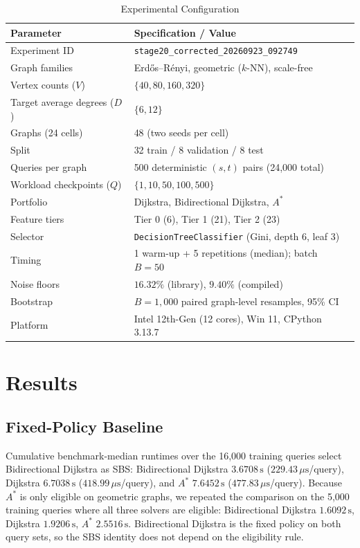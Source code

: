 \documentclass[conference]{IEEEtran}
\begin{document}
\begin{table}[t]
\caption{Experimental Configuration}
\label{tab:config}
\centering
\footnotesize
\begin{tabular}{lp{4.7cm}}
\toprule
\textbf{Parameter} & \textbf{Specification / Value} \\
\midrule
Experiment ID & \texttt{\tiny stage20\_corrected\_20260923\_092749} \\
Graph families & Erd\H{o}s--R\'enyi, geometric ($k$-NN), scale-free \\
Vertex counts ($V$) & $\{40,80,160,320\}$ \\
Target average degrees ($D$) & $\{6,12\}$ \\
Graphs (24 cells) & 48 (two seeds per cell) \\
Split & 32 train / 8 validation / 8 test \\
Queries per graph & 500 deterministic $(s,t)$ pairs (24,000 total) \\
Workload checkpoints ($Q$) & $\{1,10,50,100,500\}$ \\
Portfolio & Dijkstra, Bidirectional Dijkstra, $A^*$ \\
Feature tiers & Tier 0 (6), Tier 1 (21), Tier 2 (23) \\
Selector & \texttt{DecisionTreeClassifier} (Gini, depth 6, leaf 3) \\
Timing & 1 warm-up + 5 repetitions (median); batch $B=50$ \\
Noise floors & $16.32\%$ (library), $9.40\%$ (compiled) \\
Bootstrap & $B=1{,}000$ paired graph-level resamples, 95\% CI \\
Platform & Intel 12th-Gen (12 cores), Win 11, CPython 3.13.7 \\
\bottomrule
\end{tabular}
\end{table}

\section{Results}
\label{sec:results}

\subsection{Fixed-Policy Baseline}
Cumulative benchmark-median runtimes over the 16,000 training queries select Bidirectional Dijkstra as SBS: Bidirectional Dijkstra $3.6708\,\mathrm{s}$ ($229.43\,\mu\mathrm{s}$/query), Dijkstra $6.7038\,\mathrm{s}$ ($418.99\,\mu\mathrm{s}$/query), and $A^*$ $7.6452\,\mathrm{s}$ ($477.83\,\mu\mathrm{s}$/query). Because $A^*$ is only eligible on geometric graphs, we repeated the comparison on the 5,000 training queries where all three solvers are eligible: Bidirectional Dijkstra $1.6092\,\mathrm{s}$, Dijkstra $1.9206\,\mathrm{s}$, $A^*$ $2.5516\,\mathrm{s}$. Bidirectional Dijkstra is the fixed policy on both query sets, so the SBS identity does not depend on the eligibility rule.
\end{document}
